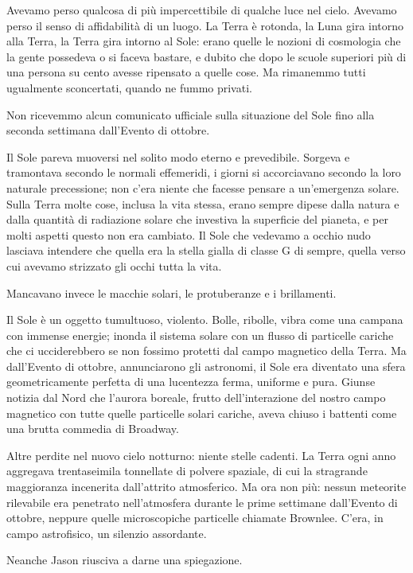 Avevamo perso qualcosa di più impercettibile di qualche luce nel cielo.
Avevamo perso il senso di affidabilità di un luogo. La Terra è rotonda,
la Luna gira intorno alla Terra, la Terra gira intorno al Sole: erano
quelle le nozioni di cosmologia che la gente possedeva o si faceva
bastare, e dubito che dopo le scuole superiori più di una persona su
cento avesse ripensato a quelle cose. Ma rimanemmo tutti ugualmente
sconcertati, quando ne fummo privati.

Non ricevemmo alcun comunicato ufficiale sulla situazione del Sole fino
alla seconda settimana dall'Evento di ottobre.

Il Sole pareva muoversi nel solito modo eterno e prevedibile. Sorgeva e
tramontava secondo le normali effemeridi, i giorni si accorciavano
secondo la loro naturale precessione; non c'era niente che facesse
pensare a un'emergenza solare. Sulla Terra molte cose, inclusa la vita
stessa, erano sempre dipese dalla natura e dalla quantità di radiazione
solare che investiva la superficie del pianeta, e per molti aspetti
questo non era cambiato. Il Sole che vedevamo a occhio nudo lasciava
intendere che quella era la stella gialla di classe G di sempre, quella
verso cui avevamo strizzato gli occhi tutta la vita.

Mancavano invece le macchie solari, le protuberanze e i brillamenti.

Il Sole è un oggetto tumultuoso, violento. Bolle, ribolle, vibra come
una campana con immense energie; inonda il sistema solare con un flusso
di particelle cariche che ci ucciderebbero se non fossimo protetti dal
campo magnetico della Terra. Ma dall'Evento di ottobre, annunciarono gli
astronomi, il Sole era diventato una sfera geometricamente perfetta di
una lucentezza ferma, uniforme e pura. Giunse notizia dal Nord che
l'aurora boreale, frutto dell'interazione del nostro campo magnetico con
tutte quelle particelle solari cariche, aveva chiuso i battenti come una
brutta commedia di Broadway.

Altre perdite nel nuovo cielo notturno: niente stelle cadenti. La Terra
ogni anno aggregava trentaseimila tonnellate di polvere spaziale, di cui
la stragrande maggioranza incenerita dall'attrito atmosferico. Ma ora
non più: nessun meteorite rilevabile era penetrato nell'atmosfera
durante le prime settimane dall'Evento di ottobre, neppure quelle
microscopiche particelle chiamate Brownlee. C'era, in campo astrofisico,
un silenzio assordante.

Neanche Jason riusciva a darne una spiegazione.

